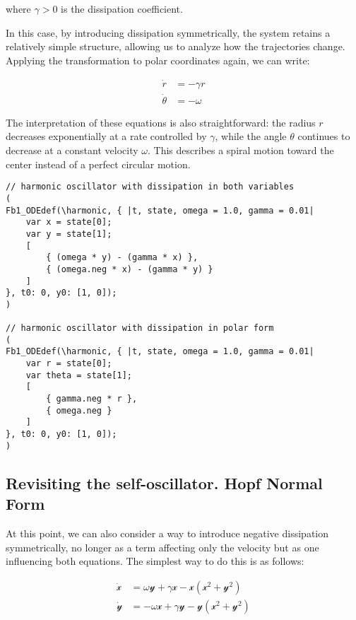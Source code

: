 \documentclass{article}
\begin{document}
where $\gamma > 0$ is the dissipation coefficient.

In this case, by introducing dissipation symmetrically, the system retains a relatively simple structure, allowing us to analyze how the trajectories change. Applying the transformation to polar coordinates again, we can write:

\begin{subequations} \label{eq_symosc_diss_polar}
\begin{align}
    \dot{r} & = -\gamma r \\
    \dot{\theta} & = -\omega 
\end{align}
\end{subequations}

The interpretation of these equations is also straightforward: the radius $r$ decreases exponentially at a rate controlled by $\gamma$, while the angle $\theta$ continues to decrease at a constant velocity $\omega$. This describes a spiral motion toward the center instead of a perfect circular motion.


\begin{lstlisting}[caption=The symmetric oscillator and the oscillation on the circle.]
// harmonic oscillator with dissipation in both variables
(
Fb1_ODEdef(\harmonic, { |t, state, omega = 1.0, gamma = 0.01|
	var x = state[0];
	var y = state[1];
	[
		{ (omega * y) - (gamma * x) },
		{ (omega.neg * x) - (gamma * y) }
	]
}, t0: 0, y0: [1, 0]);
)

// harmonic oscillator with dissipation in polar form
(
Fb1_ODEdef(\harmonic, { |t, state, omega = 1.0, gamma = 0.01|
	var r = state[0];
	var theta = state[1];
	[
		{ gamma.neg * r },
		{ omega.neg }
	]
}, t0: 0, y0: [1, 0]);
)

\end{lstlisting}



\subsection{Revisiting the self-oscillator. Hopf Normal Form}

At this point, we can also consider a way to introduce negative dissipation symmetrically, no longer as a term affecting only the velocity but as one influencing both equations. 
The simplest way to do this is as follows:

\begin{subequations} \label{eq_symosc_neg_diss}
\begin{align}
    \dot{\mathscr{x}} & = \omega\mathscr{y} + \gamma\mathscr{x} - \mathscr{x}(\mathscr{x}^2 + \mathscr{y}^2) \\
    \dot{\mathscr{y}} & = -\omega\mathscr{x} + \gamma\mathscr{y} - \mathscr{y}(\mathscr{x}^2 + \mathscr{y}^2)
\end{align}
\end{subequations}
\end{document}
